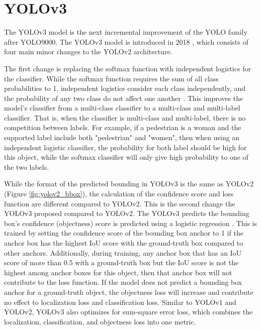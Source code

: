 \section{YOLOv3}  \label{sec:yolov3}

The YOLOv3 model is the next incremental improvement of the YOLO family after YOLO9000. The YOLOv3 model is introduced in 2018 \cite{yolov3_2018}, which consists of four main minor changes to the YOLOv2 architecture. 

The first change is replacing the softmax function with independent logistics for the classifier. While the softmax function requires the sum of all class probabilities to 1, independent logistics consider each class independently, and the probability of any two class do not affect one another \cite{yolov3_2018}. This improves the model's classifier from a multi-class classifier to a multi-class and multi-label classifier. That is, when the classifier is multi-class and multi-label, there is no competition between labels. For example, if a pedestrian is a woman and the supported label include both "pedestrian" and "women", then when using an independent logistic classifier, the probability for both label should be high for this object, while the softmax classifier will only give high probability to one of the two labels.

While the format of the predicted bounding in YOLOv3 is the same as YOLOv2 (Figure \ref{fig:yolov2_bbox}), the calculation of the confidence score and loss function are different compared to YOLOv2. This is the second change the YOLOv3 proposed compared to YOLOv2. The YOLOv3 predicts the bounding box's confidence (objectness) score is predicted using a logistic regression \cite{yolov3_2018}. This is trained by setting the confidence score of the bounding box anchor to 1 if the anchor box has the highest IoU score with the ground-truth box compared to other anchors. Additionally, during training, any anchor box that has an IoU score of more than 0.5 with a ground-truth box but the IoU score is not the highest among anchor boxes for this object, then that anchor box will not contribute to the loss function. If the model does not predict a bounding box anchor for a ground-truth object, the objectness loss will increase and contribute no effect to localization loss and classification loss. Similar to YOLOv1 and YOLOv2, YOLOv3 also optimizes for sum-square error loss, which combines the localization, classification, and objectness loss into one metric. 

